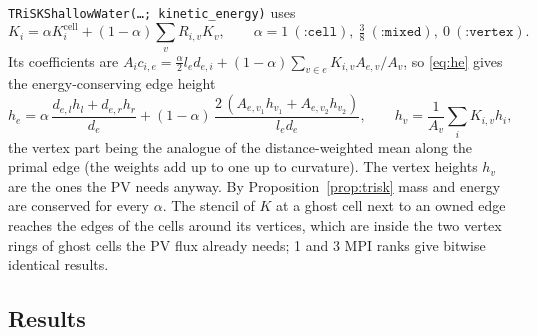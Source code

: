 \documentclass[11pt,a4paper]{article}
\newcommand{\code}[1]{\texttt{#1}}
\begin{document}
\code{TRiSKShallowWater(\dots; kinetic\_energy)} uses
\begin{equation}
  K_i = \alpha K_i^{\mathrm{cell}} + (1-\alpha)\sum_v R_{i,v}K_v,
  \qquad \alpha = 1\ (\code{:cell}),\ \tfrac38\ (\code{:mixed}),\ 0\ (\code{:vertex}).
\end{equation}
Its coefficients are
$A_ic_{i,e} = \tfrac\alpha2l_ed_{e,i} + (1-\alpha)\sum_{v\in e}K_{i,v}A_{e,v}/A_v$, so
\eqref{eq:he} gives the energy-conserving edge height
\begin{equation}
  h_e = \alpha\,\frac{d_{e,l}h_l + d_{e,r}h_r}{d_e}
      + (1-\alpha)\,\frac{2\,(A_{e,v_1}h_{v_1} + A_{e,v_2}h_{v_2})}{l_ed_e},
  \qquad h_v = \frac1{A_v}\sum_iK_{i,v}h_i,
\end{equation}
the vertex part being the analogue of the distance-weighted mean along the primal
edge (the weights add up to one up to curvature). The vertex heights $h_v$ are
the ones the PV needs anyway. By Proposition~\ref{prop:trisk} mass and energy are
conserved for every $\alpha$. The stencil of $K$ at a ghost cell next to an owned
edge reaches the edges of the cells around its vertices, which are inside the two
vertex rings of ghost cells the PV flux already needs; 1 and 3 MPI ranks give
bitwise identical results.

\subsection{Results}
\end{document}
